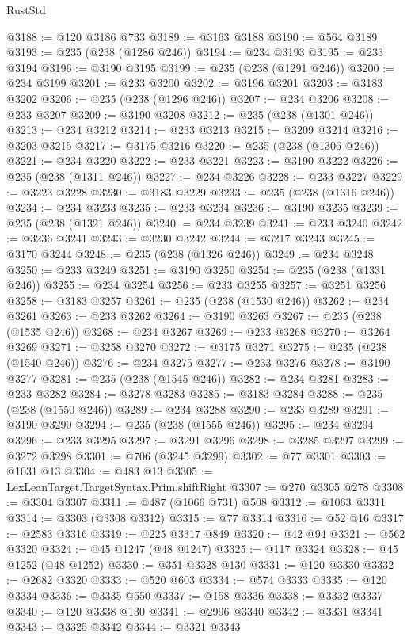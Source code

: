 \begin{lexlean}{RustStd}
\begin{coremodule}
@3188 := @120 @3186 @733
@3189 := @3163 @3188
@3190 := @564 @3189
@3193 := @235 (@238 (@1286 @246))
@3194 := @234 @3193
@3195 := @233 @3194
@3196 := @3190 @3195
@3199 := @235 (@238 (@1291 @246))
@3200 := @234 @3199
@3201 := @233 @3200
@3202 := @3196 @3201
@3203 := @3183 @3202
@3206 := @235 (@238 (@1296 @246))
@3207 := @234 @3206
@3208 := @233 @3207
@3209 := @3190 @3208
@3212 := @235 (@238 (@1301 @246))
@3213 := @234 @3212
@3214 := @233 @3213
@3215 := @3209 @3214
@3216 := @3203 @3215
@3217 := @3175 @3216
@3220 := @235 (@238 (@1306 @246))
@3221 := @234 @3220
@3222 := @233 @3221
@3223 := @3190 @3222
@3226 := @235 (@238 (@1311 @246))
@3227 := @234 @3226
@3228 := @233 @3227
@3229 := @3223 @3228
@3230 := @3183 @3229
@3233 := @235 (@238 (@1316 @246))
@3234 := @234 @3233
@3235 := @233 @3234
@3236 := @3190 @3235
@3239 := @235 (@238 (@1321 @246))
@3240 := @234 @3239
@3241 := @233 @3240
@3242 := @3236 @3241
@3243 := @3230 @3242
@3244 := @3217 @3243
@3245 := @3170 @3244
@3248 := @235 (@238 (@1326 @246))
@3249 := @234 @3248
@3250 := @233 @3249
@3251 := @3190 @3250
@3254 := @235 (@238 (@1331 @246))
@3255 := @234 @3254
@3256 := @233 @3255
@3257 := @3251 @3256
@3258 := @3183 @3257
@3261 := @235 (@238 (@1530 @246))
@3262 := @234 @3261
@3263 := @233 @3262
@3264 := @3190 @3263
@3267 := @235 (@238 (@1535 @246))
@3268 := @234 @3267
@3269 := @233 @3268
@3270 := @3264 @3269
@3271 := @3258 @3270
@3272 := @3175 @3271
@3275 := @235 (@238 (@1540 @246))
@3276 := @234 @3275
@3277 := @233 @3276
@3278 := @3190 @3277
@3281 := @235 (@238 (@1545 @246))
@3282 := @234 @3281
@3283 := @233 @3282
@3284 := @3278 @3283
@3285 := @3183 @3284
@3288 := @235 (@238 (@1550 @246))
@3289 := @234 @3288
@3290 := @233 @3289
@3291 := @3190 @3290
@3294 := @235 (@238 (@1555 @246))
@3295 := @234 @3294
@3296 := @233 @3295
@3297 := @3291 @3296
@3298 := @3285 @3297
@3299 := @3272 @3298
@3301 := @706 (@3245 @3299)
@3302 := @77 @3301
@3303 := @1031 @13
@3304 := @483 @13
@3305 := LexLeanTarget.TargetSyntax.Prim.shiftRight
@3307 := @270 @3305 @278
@3308 := @3304 @3307
@3311 := @487 (@1066 @731) @508
@3312 := @1063 @3311
@3314 := @3303 (@3308 @3312)
@3315 := @77 @3314
@3316 := @52 @16
@3317 := @2583 @3316
@3319 := @225 @3317 @849
@3320 := @42 @94
@3321 := @562 @3320
@3324 := @45 @1247 (@48 @1247)
@3325 := @117 @3324
@3328 := @45 @1252 (@48 @1252)
@3330 := @351 @3328 @130
@3331 := @120 @3330
@3332 := @2682 @3320
@3333 := @520 @603
@3334 := @574 @3333
@3335 := @120 @3334
@3336 := @3335 @550
@3337 := @158 @3336
@3338 := @3332 @3337
@3340 := @120 @3338 @130
@3341 := @2996 @3340
@3342 := @3331 @3341
@3343 := @3325 @3342
@3344 := @3321 @3343

\end{coremodule}
\end{lexlean}
